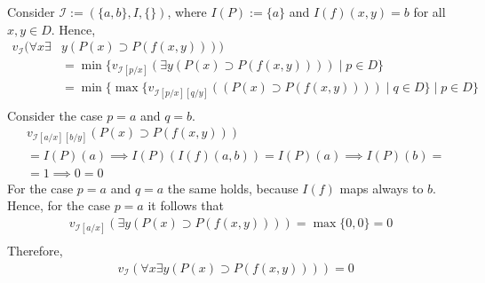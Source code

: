 \documentclass[11pt,a4paper]{article}
\begin{document}
\begin{itemize}
Consider $\mathcal{I}:=(\{a,b\}, I, \{\})$, where $I(P):=\{a\}$ and $I(f)(x,y)=b$ for all $x,y \in D$.
Hence,
\begin{equation*}
\begin{split}
v_{\mathcal{I}}(\forall x \exists  &y (P(x) \supset P(f(x,y)))) \\
&=\min \{v_{\mathcal{I}[p/x]}( \exists  y (P(x) \supset P(f(x,y))))  \mid  p \in D\}\\
&=\min \{\max \{v_{\mathcal{I}[p/x][q/y]}((P(x) \supset P(f(x,y))))  \mid  q \in D\} \mid  p \in D\} \\
\end{split}
\end{equation*}
Consider the case $p=a$ and $q=b$.
\begin{equation*}
\begin{split}
&v_{\mathcal{I}[a/x][b/y]}(P(x) \supset P(f(x,y)))\\ 
&=I(P)(a) \implies I(P)(I(f)(a,b)) = I(P)(a) \implies I(P)(b) = \\
&= 1 \implies 0 = 0
\end{split}
\end{equation*}
For the case $p=a$ and $q=a$ the same holds, because $I(f)$ maps always to $b$.
Hence, for the case $p=a$ it follows that
\begin{equation*}
\begin{split}
v_{\mathcal{I}[a/x]}( \exists  y (P(x) \supset P(f(x,y)))) = \max \{ 0,0 \} = 0 \\
\end{split}
\end{equation*}
Therefore,
\begin{equation*}
\begin{split}
&v_{\mathcal{I}}(\forall x \exists  y (P(x) \supset P(f(x,y)))) =0\\
\end{split}
\end{equation*}




\end{itemize}
\end{document}
